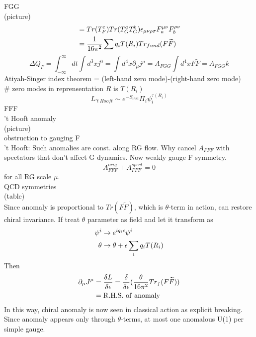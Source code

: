 \documentclass[type = bachelor]{fduthesis-en}
\begin{document}
FGG\\
(picture)
\begin{align}
\notag&=Tr(T_F^c)Tr(T_G^aT_G^b)\epsilon_{\mu\nu\rho\sigma}F_a^{\mu\nu}F_b^{\rho\sigma}\\
&=\frac{1}{16\pi^2}\sum q_iT(R_i)Tr_{fund}(F\widetilde{F})
\end{align}
\begin{equation}
\Delta Q_F=\int_{-\infty}^{\infty}dt\int d^3xj^0=\int d^4x\partial_\mu j^\mu=A_{FGG}\int d^4x F\widetilde{F}=A_{FGG}k
\end{equation}
Atiyah-Singer index theorem = (left-hand zero mode)-(right-hand zero mode)\\
\# zero modes in reprensentation $R$ is $T(R_i)$
\begin{equation}
L_{'t\ Hooft}\sim e^{-S_{inst}}\Pi_i\psi_i^{\tau(R_i)}
\end{equation}
FFF\\
't Hooft anomaly\\
(picture)\\
obstruction to gauging F\\
't Hooft: Such anomalies are const. along RG flow. Why cancel $A_{FFF}$ with spectators that don't affect G dynamics. Now weakly gauge F symmetry.
\begin{equation}
A_{FFF}^{orig}+A_{FFF}^{spect}=0
\end{equation}
for all RG scale $\mu$.\\
QCD symmetries\\
(table)\\
Since anomaly is proportional to $Tr(F\widetilde{F})$, which is $\theta$-term in action, can restore chiral invariance. If treat $\theta$ parameter as field and let it transform as
\begin{align}
\notag\psi^i&\rightarrow e^{iq_i\epsilon}\psi^i\\
\theta&\rightarrow\theta+\epsilon\sum_iq_iT(R_i)
\end{align}
Then
\begin{align}
\partial_\mu J^\mu&=\frac{\delta L}{\delta\epsilon}=\frac{\delta}{\delta\epsilon}(\frac{\theta}{16\pi^2}Tr_f(F\widetilde{F}))\\
\notag&=\mathrm{R.H.S.\ of\ anomaly}
\end{align}
In this way, chiral anomaly is now seen in classical action as explicit breaking.\\
Since anomaly appears only through $\theta$-terms, at most one anomalous U(1) per simple gauge.
\end{document}
